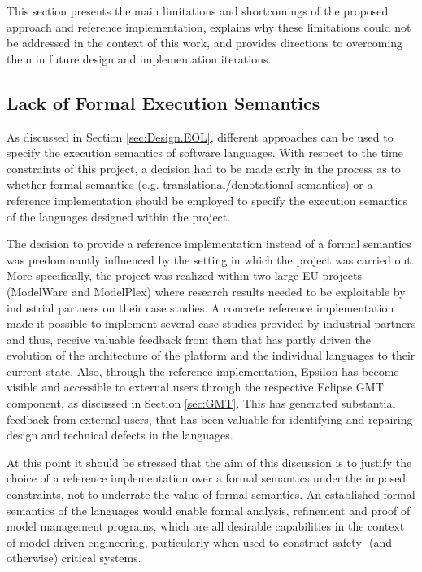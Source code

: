 This section presents the main limitations and shortcomings of the proposed approach and reference implementation, explains why these limitations could not be addressed in the context of this work, and provides directions to overcoming them in future design and implementation iterations.

\subsection{Lack of Formal Execution Semantics}
\label{sec:ExecutionSemanticsEvaluation}

As discussed in Section \ref{sec:Design.EOL}, different approaches can be used to specify the execution semantics of software languages. With respect to the time constraints of this project, a decision had to be made early in the process as to whether formal semantics (e.g. translational/denotational semantics) or a reference implementation should be employed to specify the execution semantics of the languages designed within the project.

The decision to provide a reference implementation instead of a formal semantics was predominantly influenced by the setting in which the project was carried out. More specifically, the project was realized within two large EU projects (ModelWare and ModelPlex) where research results needed to be exploitable by industrial partners on their case studies. A concrete reference implementation made it possible to implement several case studies provided by industrial partners and thus, receive valuable feedback from them that has partly driven the evolution of the architecture of the platform and the individual languages to their current state. Also, through the reference implementation, Epsilon has become visible and accessible to external users through the respective Eclipse GMT component, as discussed in Section \ref{sec:GMT}. This has generated substantial feedback from external users, that has been valuable for identifying and repairing design and technical defects in the languages.

At this point it should be stressed that the aim of this discussion is to justify the choice of a reference implementation over a formal semantics under the imposed constraints, not to underrate the value of formal semantics. An established formal semantics of the languages would enable formal analysis, refinement and proof of model management programs, which are all desirable capabilities in the context of model driven engineering, particularly when used to construct safety- (and otherwise) critical systems.

